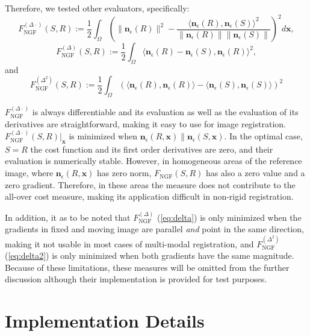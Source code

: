 \documentclass{InsightArticle}
\newcommand{\x}{\mathbf{x}}  %
\newcommand{\n}{\mathbf{n}}  %
\newcommand\nR{\n_\epsilon(R,\x)}  %
\newcommand\nS{\n_\epsilon(S,\x)}  %
\newcommand{\Fc}{\ensuremath{F_{\text{NGF}}} }   %
\newcommand{\Fcd}{\ensuremath{{F_{\text{NGF}}^{(\Delta\cdot)}}} } %
\newcommand{\Fd}{\ensuremath{{F_{\text{NGF}}^{(\Delta)}}} }
\newcommand{\Fdd}{\ensuremath{{F_{\text{NGF}}^{(\Delta^2)}}} }
\newcommand{\scalar}[2]{\ensuremath{\langle #1, #2 \rangle} }
\begin{document}
Therefore, we tested other evaluators, specifically: 
\begin{equation}
	\label{eq:cngf}
	\Fcd (S,R) := \frac{1}{2}  \int_\Omega  \left( \| \n_\epsilon(R)\|^2 - 
        \frac{\scalar{\n_\epsilon(R)}{\n_\epsilon(S)}^2}{\|\n_\epsilon(R)\|\|\n_\epsilon(S)\|} \right)^2  d\x, 
\end{equation}
\begin{equation}
	\label{eq:delta}
	\Fd (S,R) := \frac{1}{2}  \int_\Omega  \scalar{\n_\epsilon(R) - \n_\epsilon(S)}{\n_\epsilon(R)}^2, 
\end{equation}
and
\begin{equation}
	\label{eq:delta2}
	\Fdd (S,R) := \frac{1}{2}  \int_\Omega  \left(\scalar{\n_\epsilon(R)}{\n_\epsilon(R)} - 
        \scalar{\n_\epsilon(S)}{\n_\epsilon(S)}\right)^2
\end{equation}

\noindent 
\Fcd is always differentiable and its evaluation as well as the
  evaluation of its derivatives are straightforward, making it easy to use for image registration.
$\Fcd(S,R)|_{\x}$ is minimized when $\nR \parallel \nS$. 
In the optimal case, $S=R$ the cost function and its first order derivatives are zero, and their 
  evaluation is numerically stable.
However, in homogeneous areas of the reference image, where $\nR$ has zero norm, $\Fc(S,R)$ 
  has also a zero value and a zero gradient. 
Therefore, in these areas the measure does not contribute to the all-over cost measure, 
  making its application difficult in non-rigid registration.

In addition, it as to be noted that \Fd (\ref{eq:delta})
   is only minimized when the gradients in fixed and moving image 
   are parallel \emph{and} point in the same direction, making it not usable 
   in most cases of multi-modal registration,
and \Fdd (\ref{eq:delta2}) is only minimized when both gradients have the same magnitude. 
Because of these limitations, these measures will be omitted from the further discussion although
  their implementation is provided for test purposes.

\section{Implementation Details}
\label{sec:impldetail}
\end{document}
